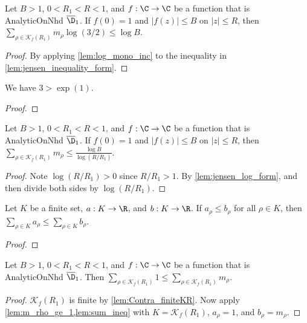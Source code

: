 \begin{lemma}\label{lem:jensen_log_form}  \leanok
Let $B>1$, $0<R_1<R<1$, and $f:\C\to\C$ be a function that is AnalyticOnNhd $\overline{\D}_1$. If $f(0)=1$ and $|f(z)|\le B$ on $|z|\le R$, then $\sum_{\rho\in\mathcal K_f(R_1)} m_\rho \log(3/2) \le \log B$.
\end{lemma}
\begin{proof} \leanok
{}
By applying \cref{lem:log_mono_inc} to the inequality in \cref{lem:jensen_inequality_form}.
\end{proof}

\begin{lemma}\label{lem:3_gt_e}  \leanok
We have $3 > \exp(1)$.
\end{lemma}
\begin{proof} \leanok
\end{proof}


\begin{lemma}\label{lem:sum_m_rho_bound}  \leanok
Let $B>1$, $0<R_1<R<1$, and $f:\C\to\C$ be a function that is AnalyticOnNhd $\overline{\D}_1$. If $f(0)=1$ and $|f(z)|\le B$ on $|z|\le R$, then $\sum_{\rho\in\mathcal K_f(R_1)} m_\rho \le \frac{\log B}{\log(R/R_1)}$.
\end{lemma}
\begin{proof}
\leanok
Note $\log(R/R_1)>0$ since $R/R_1>1$.
By \cref{lem:jensen_log_form}, and then divide both sides by $\log(R/R_1)$.
\end{proof}


\begin{lemma}\label{lem:sum_ineq}  \leanok
Let $K$ be a finite set, $a:K\to\R$, and $b:K\to\R$. If $a_\rho \le b_\rho$ for all $\rho\in K$, then $\sum_{\rho\in K} a_\rho \le \sum_{\rho\in K} b_\rho$.
\end{lemma}
\begin{proof} \leanok
\end{proof}

\begin{lemma}\label{lem:sum_m_rho_1}  \leanok
Let $B>1$, $0<R_1<R<1$, and $f:\C\to\C$ be a function that is AnalyticOnNhd $\overline{\D}_1$. Then $\sum_{\rho\in\mathcal K_f(R_1)} 1 \le \sum_{\rho\in\mathcal K_f(R_1)} m_\rho$.
\end{lemma}
\begin{proof}
\leanok
{}
$\mathcal K_f(R_1)$ is finite by \cref{lem:Contra_finiteKR}.
Now apply \cref{lem:m_rho_ge_1,lem:sum_ineq} with $K=\mathcal K_f(R_1)$, $a_\rho=1$, and $b_{\rho}=m_\rho$.
\end{proof}

